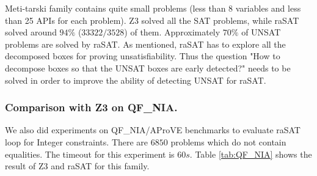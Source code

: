 \documentclass[runningheads,a4paper,oribibl]{llncs}
\begin{document}
Meti-tarski family contains quite small problems (less than 8 variables and less than 25 APIs for each problem). Z3 solved all the SAT problems, while raSAT solved around $94\%$ ($33322/3528$) of them. Approximately $70\%$ of UNSAT problems are solved by raSAT. As mentioned, raSAT has to explore all the decomposed boxes for proving unsatisfiability. Thus the question "How to decompose boxes so that the UNSAT boxes are early detected?" needs to be solved in order to improve the ability of detecting UNSAT for raSAT.
\begin{table}[t]
\centering
{}
\medskip
\caption{Experimental results for Hong, Zankl, and Meti-Tarski families}
\label{tab:QF_NRA}
\end{table}

\subsubsection{Comparison with Z3 on QF\_NIA.}
We also did experiments on QF\_NIA/AProVE benchmarks to evaluate raSAT loop for Integer constraints. There are $6850$ problems which do not contain equalities. The timeout for this experiment is $60s$. Table \ref{tab:QF_NIA} shows the result of Z3 and raSAT for this family.

\begin{table}[t]
\centering
{}
    \medskip
   	\caption{Experiments on QF\_NIA/AProVE}
   	\label{tab:QF_NIA}
\end{table}
 
\end{document}
